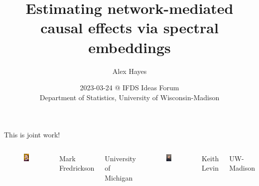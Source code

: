 \documentclass{beamer}
\title{Estimating network-mediated causal effects via spectral embeddings}
\date{2023-03-24 @ IFDS Ideas Forum \\ Department of Statistics, University of Wisconsin-Madison}
\author{Alex Hayes}
\institute{Slides available at \url{https://tinyurl.com/ifds-alex}}
\theoremstyle{remark}
\begin{document}
\maketitle

\begin{frame}{This is joint work!}

    \begin{columns}
        \centering


        \begin{figure}
            \includegraphics[width=4cm]{figures/mark.jpg}
        \end{figure}

        \centering

        Mark Fredrickson

        University of Michigan

        \centering

        \begin{figure}
            \includegraphics[width=4cm]{figures/keith.jpg}
        \end{figure}

        Keith Levin

        UW-Madison

    \end{columns}

\end{frame}
\end{document}
